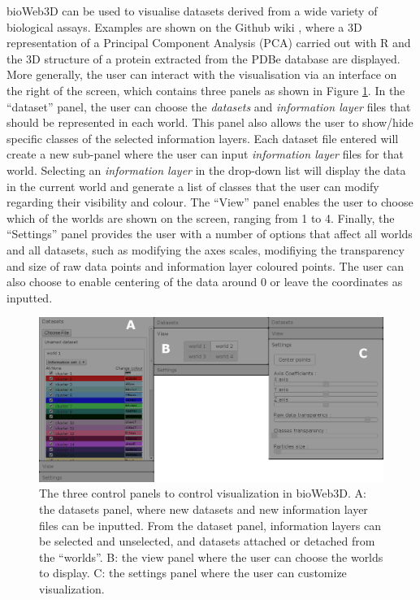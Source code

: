 	bioWeb3D can be used to visualise datasets derived from a wide variety of biological assays. Examples are shown on the Github wiki \citep{github}, where a 3D representation of a Principal Component Analysis (PCA) carried out with R and the 3D structure of a protein extracted from the PDBe database are displayed.\\
	
	More generally, the user can interact with the visualisation via an interface on the right of the screen, which contains three panels as shown in Figure \ref{fig:panels}. In the ``dataset'' panel, the user can choose the {\it{datasets}} and {\it{information layer}} files that should be represented in each world. This panel also allows the user to show/hide specific classes of the selected information layers. Each dataset file entered will create a new sub-panel where the user can input {\it{information layer}} files for that world. Selecting an {\it{information layer}} in the drop-down list will display the data in the current world and generate a list of classes that the user can modify regarding their visibility and colour. The ``View'' panel enables the user to choose which of the worlds are shown on the screen, ranging from 1 to 4. Finally, the ``Settings'' panel provides the user with a number of options that affect all worlds and all datasets, such as modifying the axes scales, modifiying the transparency and size of raw data points and information layer coloured points. The user can also choose to enable centering of the data around 0 or leave the coordinates as inputted.\\
	
	\begin{figure}[h]
\centerline{\includegraphics[width=\linewidth]{gfx/chapter3/panels.png}}
\caption{The three control panels to control visualization in bioWeb3D. A: the datasets panel, where new datasets and new information layer files can be inputted. From the dataset panel, information layers can be selected and unselected, and datasets attached or detached from the ``worlds''. B: the view panel where the user can choose the worlds to display. C: the settings panel where the user can customize visualization.}\label{fig:panels}
	\end{figure}


